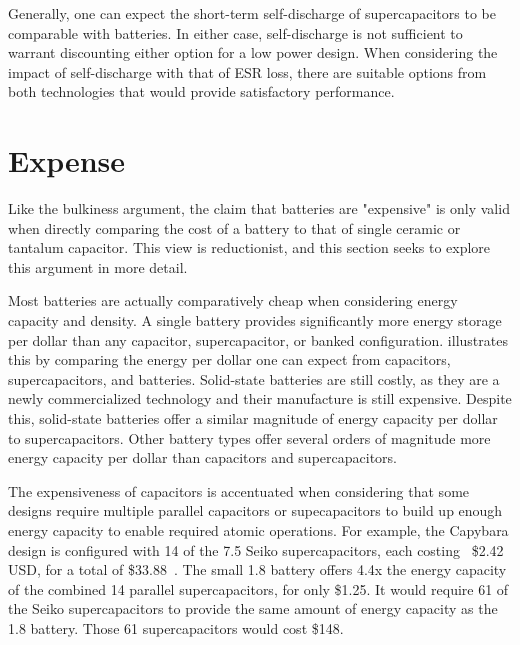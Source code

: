 
Generally, one can expect the short-term self-discharge of supercapacitors to be comparable with batteries. In either case, self-discharge is not sufficient to warrant discounting either option for a low power design. When considering the impact of self-discharge with that of ESR loss, there are suitable options from both technologies that would provide satisfactory performance.


\section{Expense}
\label{sec:battery:cost}
Like the bulkiness argument, the claim that batteries are "expensive" is only valid when directly comparing the cost of a battery to that of single ceramic or tantalum capacitor. This view is reductionist, and this section seeks to explore this argument in more detail.

Most batteries are actually comparatively cheap when considering energy capacity and density. 
A single battery provides significantly more energy storage per dollar than any capacitor, supercapacitor, or banked configuration.
 illustrates this by comparing the energy per dollar one can expect from capacitors, supercapacitors, and batteries. 
Solid-state batteries are still costly, as they are a newly commercialized technology and their manufacture is still expensive. 
Despite this, solid-state batteries offer a similar magnitude of energy capacity per dollar to supercapacitors.
Other battery types offer several orders of magnitude more energy capacity per dollar than capacitors and supercapacitors.

The expensiveness of capacitors is accentuated when considering that some designs require multiple parallel capacitors or supecapacitors to build up enough energy capacity to enable required atomic operations. For example, the Capybara design is configured with 14 of the 7.5\ssi{\milli\farad} Seiko supercapacitors, each costing ~\$2.42 USD, for a total of \$33.88~\cite{colinReconfigurable18}. The small 1.8 \ssi{\milli\Ah} battery offers 4.4x the energy capacity of the combined 14 parallel supercapacitors, for only \$1.25.
It would require 61 of the Seiko supercapacitors to provide the same amount of energy capacity as the 1.8\ssi{\milli\Ah} battery. Those 61 supercapacitors would cost \$148.

